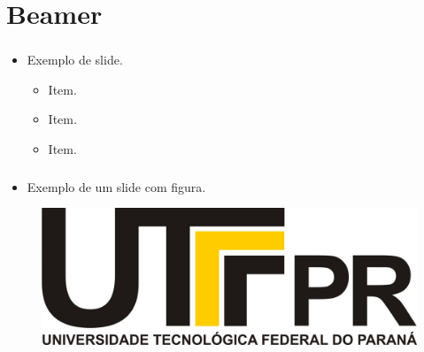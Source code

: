 \documentclass[aspectratio=169]{beamer}
\author{prof. Fábio Engel}
\begin{document}
\frame{
\titlepage
}



\section{Beamer}


\begin{frame}[fragile]
	\frametitle{\secname}
	\begin{itemize}
		\item Exemplo de slide.
		\begin{itemize}
			\item Item.
			\item Item.
			\item Item.
		\end{itemize}
	\end{itemize}
\end{frame}


\begin{frame}[fragile]
	\frametitle{\secname}
	\begin{itemize}
		\item Exemplo de um slide com figura.
	\end{itemize}
	\begin{figure}[!htbp]
		\centering
		\includegraphics[width=0.5\linewidth]{fig/utfpr}
	\end{figure}
\end{frame}
\end{document}
